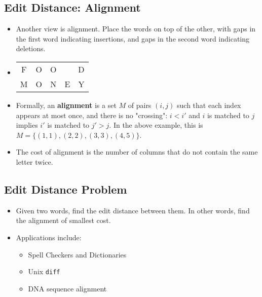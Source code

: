 \subsection{Edit Distance: Alignment}
\begin{itemize}
    \item Another view is alignment. Place the words on top of the other, with gaps in the first word indicating insertions, and gaps in the second word indicating deletions.
    \item[] 
        \begin{center}
            \begin{tabular}{c c c c c}
                F & O & O &  & D \\
                M & O & N & E & Y \\
            \end{tabular}
        \end{center}
    \item Formally, an \textbf{alignment} is a set $M$ of pairs $(i, j)$ such that each index appears at most once, and there is no "crossing": $i < i'$ and $i$ is matched to $j$ implies $i'$ is matched to $j' > j$. In the above example, this is $M = \{ (1, 1), (2, 2), (3, 3), (4, 5) \}$.
    \item The cost of alignment is the number of columns that do not contain the same letter twice.
\end{itemize}

\subsection{Edit Distance Problem}
\begin{itemize}
    \item Given two words, find the edit distance between them. In other words, find the alignment of smallest cost.
    \item Applications include:
    \begin{itemize}
        \item Spell Checkers and Dictionaries
        \item Unix \texttt{diff}
        \item DNA sequence alignment
    \end{itemize}
\end{itemize}

